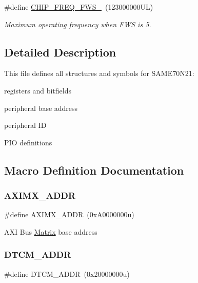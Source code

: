 \begin{DoxyCompactItemize}
\mbox{\label{group__SAME70N21__definitions_ga3b66824f858591135877b369f98d48a5}} 
\#define \mbox{\hyperlink{group__SAME70N21__definitions_ga3b66824f858591135877b369f98d48a5}{C\+H\+I\+P\+\_\+\+F\+R\+E\+Q\+\_\+\+F\+W\+S\+\_}}~(123000000\+U\+L)
\begin{DoxyCompactList}\small\item\em Maximum operating frequency when F\+WS is 5. \end{DoxyCompactList}\end{DoxyCompactItemize}


\subsection{Detailed Description}
This file defines all structures and symbols for S\+A\+M\+E70\+N21\+:
\begin{DoxyItemize}
\item registers and bitfields
\item peripheral base address
\item peripheral ID
\item P\+IO definitions 
\end{DoxyItemize}

\subsection{Macro Definition Documentation}
\mbox{\label{group__SAME70N21__definitions_ga2fb7cc681bf5e7fbce5e3635b72a330a}} 
\subsubsection{\texorpdfstring{AXIMX\_ADDR}{AXIMX\_ADDR}}
{\footnotesize\ttfamily \#define A\+X\+I\+M\+X\+\_\+\+A\+D\+DR~(0x\+A0000000u)}

A\+XI Bus \mbox{\hyperlink{structMatrix}{Matrix}} base address \mbox{\label{group__SAME70N21__definitions_ga26626a425f7ebb3a0c2dbc276f0d9f78}} 
\subsubsection{\texorpdfstring{DTCM\_ADDR}{DTCM\_ADDR}}
{\footnotesize\ttfamily \#define D\+T\+C\+M\+\_\+\+A\+D\+DR~(0x20000000u)}

